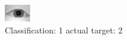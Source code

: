 \begin{figure}[h!]
\begin{center}
\includegraphics[width=0.60\columnwidth]{figures/ID904_class_1_target_2.png}
\end{center}
\caption{ Classification: 1 actual target: 2}
\label{fig:ID904_class_1_target_2}
\end{figure}
